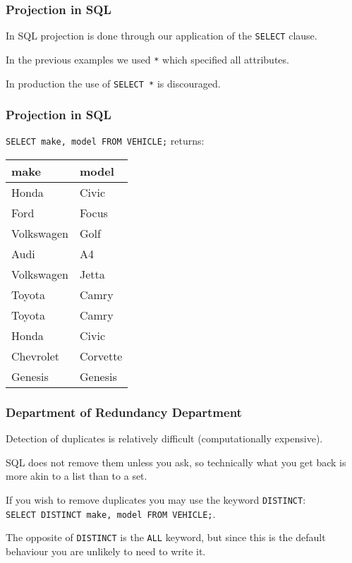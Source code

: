\begin{frame}
\frametitle{Projection in SQL}
In SQL projection is done through our application of the \texttt{SELECT} clause. 

In the previous examples we used \texttt{*} which specified all attributes. 

In production the use of \texttt{SELECT *} is discouraged.

\end{frame}



\begin{frame}
\frametitle{Projection in SQL}

\texttt{SELECT make, model FROM VEHICLE;}  returns:

\begin{center}
\begin{tabular}{|l|l|} \hline
	\textbf{make} & \textbf{model} \\ \hline
	Honda & Civic \\ \hline
	Ford & Focus \\ \hline
	Volkswagen & Golf \\ \hline
	Audi & A4  \\ \hline
	Volkswagen & Jetta \\ \hline
	Toyota & Camry  \\ \hline
	Toyota & Camry  \\ \hline
	Honda & Civic  \\ \hline
	Chevrolet & Corvette  \\ \hline
	 Genesis & Genesis \\ \hline
\end{tabular}
\end{center}


\end{frame}



\begin{frame}
\frametitle{Department of Redundancy Department}

Detection of duplicates is relatively difficult (computationally expensive).

SQL does not remove them unless you ask, so technically what you get back is more akin to a list than to a set. 

If you wish to remove duplicates you may use the keyword \texttt{DISTINCT}:\\\texttt{SELECT DISTINCT make, model FROM VEHICLE;}.

The opposite of \texttt{DISTINCT} is the \texttt{ALL} keyword, but since this is the default behaviour you are unlikely to need to write it.

\end{frame}



